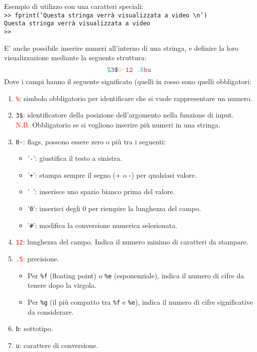 Esempio di utilizzo con una caratteri speciali: \\
\texttt{>> fprint('Questa stringa verrà visualizzata a video \textbackslash n')} \\
\texttt{Questa stringa verrà visualizzata a video} \\
\texttt{>>}
\break

\newpage
E' anche possibile inserire numeri all'interno di una stringa, e definire la loro visualizzazione mediante la seguente 
struttura:
$$\texttt{\textcolor{Green}{\%}\textcolor{Blue}{3\$}\textcolor{Dandelion}{0-}\textcolor{purple}{12}
\textcolor{Cyan}{.5}\textcolor{Maroon}{b}\textcolor{Violet}{u}}$$
Dove i campi hanno il seguente significato (quelli in rosso sono quelli obbligatori:
\begin{enumerate}
	\item	\textcolor{red}{\texttt{\%}}: simbolo obbligatorio per identificare che si vuole 
						rappresentare un numero.
	\item 	\texttt{3\$}: identificatore della posizione dell'argomento nella funzione di input. \\
						\textcolor{red}{N.B.} Obbligatorio se si vogliono inserire più numeri in una stringa.
	\item 	\texttt{0-}: flags, possono essere zero o più tra i seguenti:
			\begin{itemize}
				\item	'\texttt{-}': giustifica il testo a sinistra.
				\item	'\texttt{+}': stampa sempre il segno (+ o -) per qualsiasi valore.
				\item	'\texttt{ }': inserisce uno spazio bianco prima del valore.
				\item	'\texttt{0}': inserisci degli 0 per riempire la lunghezza del campo.
				\item 	'\texttt{\#}': modifica la conversione numerica selezionata.			
			\end{itemize}
						
	\item	\textcolor{red}{\texttt{12}}: lunghezza del campo. Indica il numero minimo di caratteri da 
			stampare.
	\item	\textcolor{red}{\texttt{.5}}: precisione. 
			\begin{itemize}
				\item	Per \texttt{\%f} (floating point) o \texttt{\%e} (esponenziale), indica il
						numero di cifre da tenere dopo la virgola.
				\item 	Per \texttt{\%g} (il più compatto tra \texttt{\%f} e \texttt{\%e}), indica il
						numero di cifre significative da considerare.
			\end{itemize}
	\item 	\texttt{b}: sottotipo.
	\item	\texttt{u}: carattere di conversione.
\end{enumerate}
